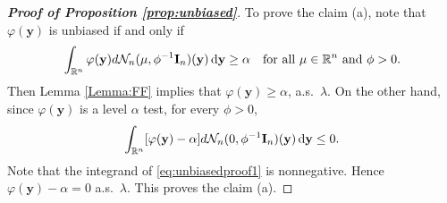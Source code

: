 \documentclass[bj]{imsart}
\DeclareMathOperator{\myRank}{Rank}
\DeclareMathOperator{\myE}{E}
\newcommand{\By}{\mathbf{y}}    \newcommand{\Bz}{\mathbf{z}}
\theoremstyle{plain}
\theoremstyle{definition}
\theoremstyle{remark}
\begin{document}
\begin{proof}[\textbf{Proof of Proposition \ref{prop:unbiased}}]
    
    To prove the claim (a), 
    note that $\varphi(\By)$ is unbiased if and only if
    \begin{equation*}
        \int_{\mathbb R^n} \varphi(\By) d\mathcal N_n (\mu,\phi^{-1} \BI_n) (\By) \,\mathrm{d} \By\geq \alpha
        \quad \text{for all $\mu\in \mathbb R^n$ and $\phi>0$}.
    \end{equation*}
    Then Lemma \ref{Lemma:FF} implies that $\varphi(\By) \geq \alpha$, a.s.\ $\lambda$.
    On the other hand, since $\varphi(\By)$ is a level $\alpha$ test, for every $\phi>0$,
    \begin{equation}\label{eq:unbiasedproof1}
        \int_{\mathbb R^n} [\varphi(\By)-\alpha] d\mathcal N_n (0,\phi^{-1} \BI_n)(\By) \,\mathrm{d} \By\leq 0.
    \end{equation}
    Note that the integrand of \eqref{eq:unbiasedproof1} is nonnegative. Hence $\varphi(\By)-\alpha=0$ a.s.\ $\lambda$.
    This proves the claim (a). 


\end{proof}
\end{document}
